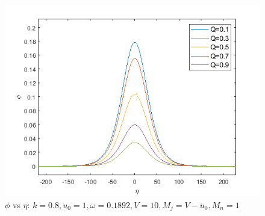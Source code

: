 \documentclass[journal]{IEEEtran}
\begin{document}
	\begin{figure}[h!]
		\centering
		\includegraphics[width=1\linewidth]{"kdv soliton profiles"}
		\caption{$\phi$ vs $\eta$: $k = 0.8, u_0 = 1, \omega = 0.1892, V = 10, M_j = V - u_0, M_n = 1$}
		\label{fig:fig4}
	\end{figure}
\end{document}
